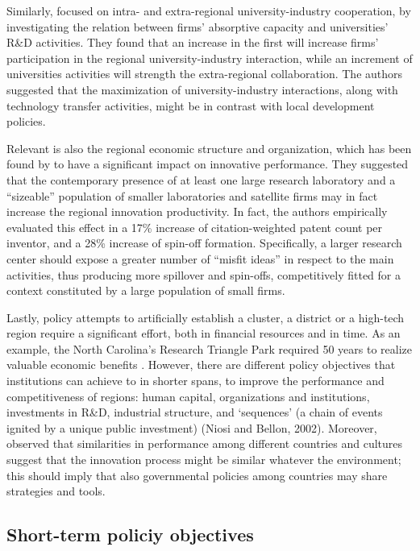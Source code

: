 Similarly, \citet{AzagraCaro2010} focused on intra- and extra-regional university-industry cooperation, by investigating the relation between firms' absorptive capacity and universities' R\&D activities. They found that an increase in the first will increase firms' participation in the regional university-industry interaction, while an increment of universities activities will strength the extra-regional collaboration. The authors suggested that the maximization of university-industry interactions, along with technology transfer activities, might be in contrast with local development policies.

Relevant is also the regional economic structure and organization, which has been found by \citet{Agrawal2014} to have a significant impact on innovative performance. They suggested that the contemporary presence of at least one large research laboratory and a \enquote{sizeable} population of smaller laboratories and satellite firms may in fact increase the regional innovation productivity. In fact, the authors empirically evaluated this effect in a 17\% increase of citation-weighted patent count per inventor, and a 28\% increase of spin-off formation. Specifically, a larger research center should expose a greater number of \enquote{misfit ideas} in respect to the main activities, thus producing more spillover and spin-offs, competitively fitted for a context constituted by a large population of small firms.

Lastly, policy attempts to artificially establish a cluster, a district or a high-tech region require a significant effort, both in financial resources and in time. As an example, the North Carolina's Research Triangle Park required 50 years to realize valuable economic benefits \citep{Bercovitz2006}. However, there are different policy objectives that institutions can achieve to in shorter spans, to improve the performance and competitiveness of regions: human capital, organizations and institutions, investments in R\&D, industrial structure, and ‘sequences' (a chain of events ignited by a unique public investment) (Niosi and Bellon, 2002). Moreover, \citet{Heher2006} observed that similarities in performance among different countries and cultures suggest that the innovation process might be similar whatever the environment; this should imply that also governmental policies among countries may share strategies and tools.  

\subsection{Short-term policiy objectives}


